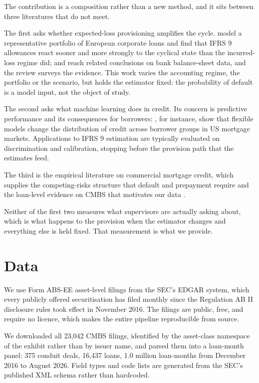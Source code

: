 \documentclass[11pt]{article}
\begin{document}
The contribution is a composition rather than a new method, and it sits between three literatures that do not
meet.

The first asks whether expected-loss provisioning amplifies the cycle. \citet{abad2017cyclical} model a
representative portfolio of European corporate loans and find that IFRS 9 allowances react sooner and more
strongly to the cyclical state than the incurred-loss regime did; \citet{kund2023resilience} and
\citet{fatouh2023cyclicality} reach related conclusions on bank balance-sheet data, and the
\citet{bcbs2021procyclicality} review surveys the evidence. This work varies the accounting regime, the portfolio
or the scenario, but holds the estimator fixed: the probability of default is a model input, not the object of
study.

The second asks what machine learning does in credit. Its concern is predictive performance and its consequences
for borrowers: \citet{fuster2022unequal}, for instance, show that flexible models change the distribution of
credit across borrower groups in US mortgage markets. Applications to IFRS 9 estimation are typically evaluated on
discrimination and calibration, stopping before the provision path that the estimates feed.

The third is the empirical literature on commercial mortgage credit, which supplies the competing-risks structure
that default and prepayment require and the loan-level evidence on CMBS that motivates our data
\citep{an2011cmbs}.

Neither of the first two measures what supervisors are actually asking about, which is what happens to the
provision when the estimator changes and everything else is held fixed. That measurement is what we provide.

\section{Data}
\label{sec:data}
We use Form ABS-EE asset-level filings from the SEC's EDGAR system, which every publicly offered securitisation
has filed monthly since the Regulation AB II disclosure rules took effect in November 2016. The filings are
public, free, and require no licence, which makes the entire pipeline reproducible from source.

We downloaded all 23{,}042 CMBS filings, identified by the asset-class namespace of the exhibit rather than by
issuer name, and parsed them into a loan-month panel: 375 conduit deals, 16{,}437 loans, 1.0 million loan-months
from December 2016 to August 2026. Field types and code lists are generated from the SEC's published XML schema
rather than hardcoded.
\end{document}
